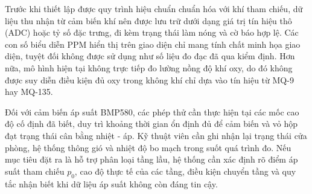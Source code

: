 Trước khi thiết lập được quy trình hiệu chuẩn chuẩn hóa với khí tham chiếu, dữ liệu thu nhận từ cảm biến khí nên được lưu trữ dưới dạng giá trị tín hiệu thô (ADC) hoặc tỷ số đặc trưng, đi kèm trạng thái làm nóng và cờ báo hợp lệ. Các con số biểu diễn PPM hiển thị trên giao diện chỉ mang tính chất minh họa giao diện, tuyệt đối không được sử dụng như số liệu đo đạc đã qua kiểm định. Hơn nữa, mô hình hiện tại không trực tiếp đo lường nồng độ khí oxy, do đó không được suy diễn điều kiện đủ oxy trong không khí chỉ dựa vào tín hiệu từ MQ-9 hay MQ-135.

Đối với cảm biến áp suất BMP580, các phép thử cần thực hiện tại các mốc cao độ cố định đã biết, duy trì khoảng thời gian ổn định đủ để cảm biến và vỏ hộp đạt trạng thái cân bằng nhiệt - áp. Kỹ thuật viên cần ghi nhận lại trạng thái cửa phòng, hệ thống thông gió và nhiệt độ bo mạch trong suốt quá trình đo. Nếu mục tiêu đặt ra là hỗ trợ phân loại tầng lầu, hệ thống cần xác định rõ điểm áp suất tham chiếu $p_0$, cao độ thực tế của các tầng, điều kiện chuyển tầng và quy tắc nhận biết khi dữ liệu áp suất không còn đáng tin cậy.